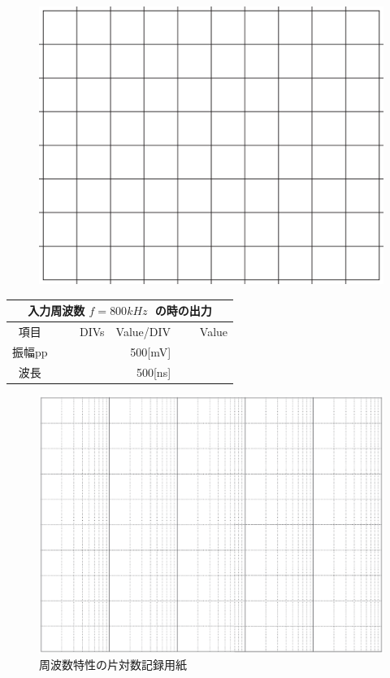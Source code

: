 \documentclass[uplatex,a4paper,11pt,oneside,openany]{jsbook}
\begin{document}
\begin{multicols}{2}
  \begin{figure}[H]
     \centering
      \includegraphics[keepaspectratio, scale=0.28, angle=0]
                  {figs/eps/grid.eps}
                  \label{fig:grid50mV}
  \end{figure}

  \begin{spacing}{1.5}
  \begin{tabular}{|c||r|r|r|}
    \multicolumn{4}{c}{入力周波数 $f=800kHz\;$ の時の出力} \\ \hline
    項目 & DIVs & Value/DIV & Value \\ \hline \hline
    振幅pp & 　　　　 & 500[mV]& 　　　　 \\ \hline
    波長 & 　　　　 & 500[ns]& 　　　　 \\ \hline
  \end{tabular}
\end{spacing}
\end{multicols}

\newpage

\begin{figure}[H]
	\centering
	\includegraphics[keepaspectratio, scale=0.76, angle=90]
	{figs/eps/logscale.eps}
	\caption{周波数特性の片対数記録用紙}
	\label{fig:23}
\end{figure}

\end{document}
